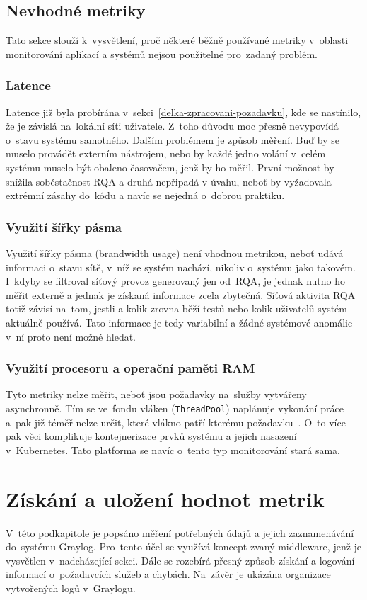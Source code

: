 \subsection{Nevhodné metriky}
\label{nevhodne-metriky}
Tato sekce slouží k~vysvětlení, proč některé běžně používané metriky v~oblasti monitorování aplikací a systémů nejsou použitelné pro~zadaný problém.

\subsubsection{Latence}
Latence již byla probírána v~sekci~\ref{delka-zpracovani-pozadavku}, kde se nastínilo, že je závislá na~lokální síti uživatele. Z~toho důvodu moc přesně nevypovídá o~stavu systému samotného. Dalším problémem je způsob měření. Buď by se muselo provádět externím nástrojem, nebo by každé jedno volání v~celém systému muselo být obaleno časovačem, jenž by ho měřil. První možnost by snížila soběstačnost RQA a druhá nepřipadá v úvahu, neboť by vyžadovala extrémní zásahy do~kódu a navíc se nejedná o~dobrou praktiku.

\subsubsection{Využití šířky pásma}
Využití šířky pásma (brandwidth usage) není vhodnou metrikou, neboť udává informaci o~stavu sítě, v~níž se systém nachází, nikoliv o~systému jako takovém. I~kdyby se filtroval síťový provoz generovaný jen od~RQA, je jednak nutno ho měřit externě a jednak je získaná informace zcela zbytečná. Síťová aktivita RQA totiž závisí na~tom, jestli a kolik zrovna běží testů nebo kolik uživatelů systém aktuálně používá. Tato informace je tedy variabilní a žádné systémové anomálie v~ní proto není možné hledat.

\subsubsection{Využití procesoru a operační paměti RAM}
Tyto metriky nelze měřit, neboť jsou požadavky na~služby vytvářeny asynchronně. Tím se ve~fondu vláken (\texttt{ThreadPool}) naplánuje vykonání práce a~pak již téměř nelze určit, které vlákno patří kterému požadavku~\cite{threadpool}. O~to více pak věci komplikuje kontejnerizace prvků systému a jejich nasazení v~Kubernetes. Tato platforma se navíc o~tento typ monitorování stará sama.

\section{Získání a uložení hodnot metrik}
V~této podkapitole je popsáno měření potřebných údajů a jejich zaznamenávání do~systému Graylog. Pro~tento účel se využívá koncept zvaný middleware, jenž je vysvětlen v~nadcházející sekci. Dále se rozebírá přesný způsob získání a logování informací o~požadavcích služeb a chybách. Na~závěr je ukázána organizace vytvořených logů v~Graylogu.

